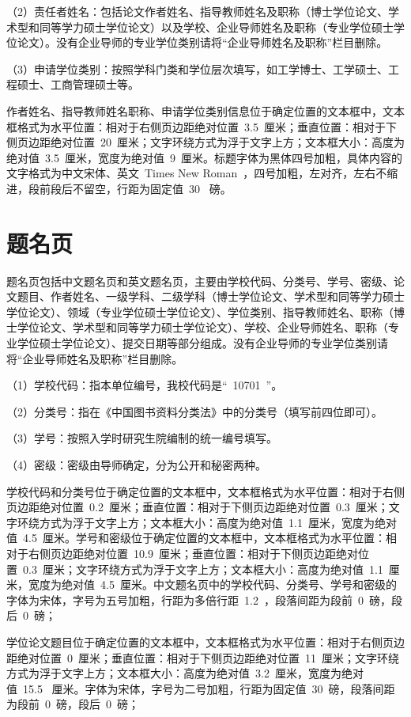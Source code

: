 （2）责任者姓名：包括论文作者姓名、指导教师姓名及职称（博士学位论文、学术型和同等学力硕士学位论文）以及学校、企业导师姓名及职称（专业学位硕士学位论文）。没有企业导师的专业学位类别请将“企业导师姓名及职称”栏目删除。

（3）申请学位类别：按照学科门类和学位层次填写，如工学博士、工学硕士、工程硕士、工商管理硕士等。

作者姓名、指导教师姓名职称、申请学位类别信息位于确定位置的文本框中，文本框格式为水平位置：相对于右侧页边距绝对位置~3.5~厘米；垂直位置：相对于下侧页边距绝对位置~20~厘米；文字环绕方式为浮于文字上方；文本框大小：高度为绝对值~3.5~厘米，宽度为绝对值~9~厘米。标题字体为黑体四号加粗，具体内容的文字格式为中文宋体、英文~Times New Roman~，四号加粗，左对齐，左右不缩进，段前段后不留空，行距为固定值~30~ 磅。

\section{题名页}

题名页包括中文题名页和英文题名页，主要由学校代码、分类号、学号、密级、论文题目、作者姓名、一级学科、二级学科（博士学位论文、学术型和同等学力硕士学位论文）、领域（专业学位硕士学位论文）、学位类别、指导教师姓名、职称（博士学位论文、学术型和同等学力硕士学位论文）、学校、企业导师姓名、职称（专业学位硕士学位论文）、提交日期等部分组成。没有企业导师的专业学位类别请将“企业导师姓名及职称”栏目删除。

（1）学校代码：指本单位编号，我校代码是“~10701~”。

（2）分类号：指在《中国图书资料分类法》中的分类号（填写前四位即可）。

（3）学号：按照入学时研究生院编制的统一编号填写。

（4）密级：密级由导师确定，分为公开和秘密两种。

学校代码和分类号位于确定位置的文本框中，文本框格式为水平位置：相对于右侧页边距绝对位置~0.2~厘米；垂直位置：相对于下侧页边距绝对位置~0.3~厘米；文字环绕方式为浮于文字上方；文本框大小：高度为绝对值~1.1~厘米，宽度为绝对值~4.5~厘米。学号和密级位于确定位置的文本框中，文本框格式为水平位置：相对于右侧页边距绝对位置~10.9~厘米；垂直位置：相对于下侧页边距绝对位置~0.3~厘米；文字环绕方式为浮于文字上方；文本框大小：高度为绝对值~1.1~厘米，宽度为绝对值~4.5~厘米。中文题名页中的学校代码、分类号、学号和密级的字体为宋体，字号为五号加粗，行距为多倍行距~1.2~，段落间距为段前~0~磅，段后~0~磅；

学位论文题目位于确定位置的文本框中，文本框格式为水平位置：相对于右侧页边距绝对位置~0~厘米；垂直位置：相对于下侧页边距绝对位置~11~厘米；文字环绕方式为浮于文字上方；文本框大小：高度为绝对值~3.2~厘米，宽度为绝对值~15.5~ 厘米。字体为宋体，字号为二号加粗，行距为固定值~30~磅，段落间距为段前~0~磅，段后~0~磅；

